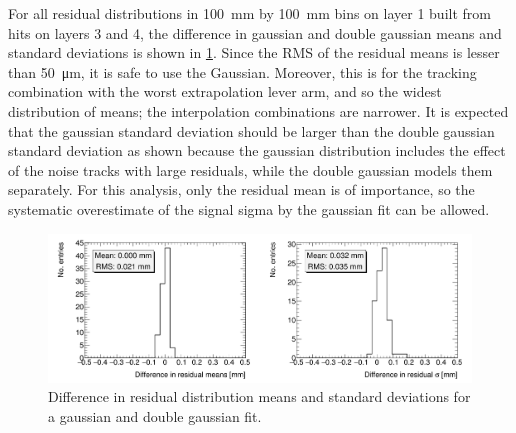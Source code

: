 For all residual distributions in \SI{100}{\milli\meter} by \SI{100}{\milli\meter} bins on layer 1 built from hits on layers 3 and 4, the difference in gaussian and double gaussian means and standard deviations is shown in \ref{fig:double_gaussian_compare_fits}. Since the RMS of the residual means is lesser than \SI{50}{\micro\meter}, it is safe to use the Gaussian. Moreover, this is for the tracking combination with the worst extrapolation lever arm, and so the widest distribution of means; the interpolation combinations are narrower. It is expected that the gaussian standard deviation should be larger than the double gaussian standard deviation as shown because the gaussian distribution includes the effect of the noise tracks with large residuals, while the double gaussian models them separately. For this analysis, only the residual mean is of importance, so the systematic overestimate of the signal sigma by the gaussian fit can be allowed.

\begin{figure}
    \centering
    \includegraphics[width = \textwidth]{figures/figure_compare_residual_fits_QL2C04_2900V_2021-02-08_2_fit_range_mean_pm_RMS_minus_quick_and_dirty_2900V_log_scale_layer1_fixedlayers34.png}
    \caption{Difference in residual distribution means and standard deviations for a gaussian and double gaussian fit.}
    \label{fig:double_gaussian_compare_fits}
\end{figure}

